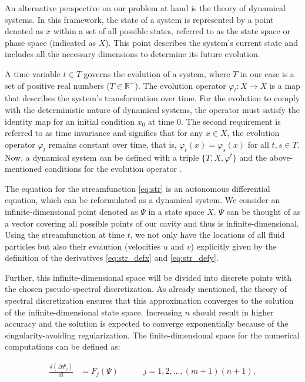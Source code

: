 An alternative perspective on our problem at hand is the theory of dynamical
systems. In this framework, the state of a system is represented by a point
denoted as $x$ within a set of all possible states, referred to as the state
space or phase space (indicated as $X$). This point describes the system's
current state and includes all the necessary dimensions to determine its future
evolution.

A time variable $t \in T$ governs the evolution of a system, where $T$ in our
case is a set of positive real numbers ($T \in \mathbb{R}^+$). The evolution
operator $\varphi_t : X \to X$ is a map that describes the system's
transformation over time. For the evolution to comply with the deterministic
nature of dynamical systems, the operator must satisfy the identity map for an
initial condition $x_0$ at time $0$. The second requirement is referred to as
time invariance and signifies that for any $x \in X$, the evolution operator
$\varphi_t$ remains constant over time, that is, $\varphi_t(x) = \varphi_s(x)$
for all $t, s \in T$. Now, a dynamical system can be defined with a triple $\{
T, X, \varphi^t \}$ and the above-mentioned conditions for the evolution
operator \citep{kuznetsov2004}.

The equation for the streamfunction \eqref{eq:str} is an autonomous
differential equation, which can be reformulated as a dynamical system. We
consider an infinite-dimensional point denoted as $\Psi$ in a state space $X$.
$\Psi$ can be thought of as a vector covering all possible points of our cavity
and thus is infinite-dimensional. Using the streamfunction at time $t$, we not
only have the locations of all fluid particles but also their evolution
(velocities $u$ and $v$) explicitly given by the definition of the derivatives
\eqref{eq:str_defx} and \eqref{eq:str_defy}.

Further, this infinite-dimensional space will be divided into discrete points
with the chosen pseudo-spectral discretization. As already mentioned, the
theory of spectral discretization ensures that this approximation converges to
the solution of the infinite-dimensional state space. Increasing $n$ should
result in higher accuracy and the solution is expected to converge
exponentially because of the singularity-avoiding regularization. The
finite-dimensional space for the numerical computations can be defined as:

\begin{align}
  \frac{d(\Delta \Psi_j)}{dt} &= {F_j(\Psi)} \quad \quad \quad
    j= 1,2, ...,(m+1)(n+1), \label{eq:dyn_sys}
\end{align}

